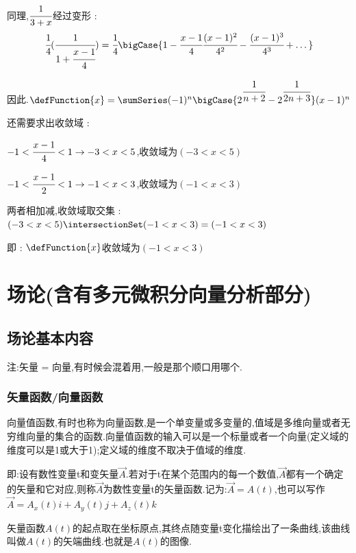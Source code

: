 {{{{\begin{enumerate}
{            同理,$\cfrac{1}{3 + x}$经过变形 :
            $$
              \cfrac{1}{4}(\cfrac{1}{1 + \cfrac{x - 1}{4}}) = \cfrac{1}{4}\bigCase{1 - \cfrac{x - 1}{4} \cfrac{(x - 1)^2}{4^2} - \cfrac{(x - 1)^3}{4^3} + \dots}
            $$

            因此.$\defFunction{x} = \sumSeries(-1)^n\bigCase{2^{\cfrac{1}{n + 2}} - 2^{\cfrac{1}{2n + 3}}}(x - 1)^n$

            还需要求出收敛域 :

            $-1 < \cfrac{x - 1}{4} < 1 \to -3 < x < 5$,收敛域为$(-3 < x < 5)$

            $-1 < \cfrac{x - 1}{2} < 1 \to -1 < x < 3$,收敛域为$(-1 < x < 3)$

            两者相加减,收敛域取交集 : $(-3 < x < 5) \intersectionSet (-1 < x < 3) = (-1 < x < 3)$

            即 : $\defFunction{x}$收敛域为$(-1 < x < 3)$
            }
    \end{enumerate}
  }%

}%

}%

\section{场论(含有多元微积分向量分析部分)}{

  \subsection{场论基本内容}{
    注:矢量 = 向量,有时候会混着用,一般是那个顺口用哪个.

    \subsubsection{矢量函数/向量函数}{
      向量值函数,有时也称为向量函数,是一个单变量或多变量的,值域是多维向量或者无穷维向量的集合的函数.向量值函数的输入可以是一个标量或者一个向量(定义域的维度可以是1或大于1);定义域的维度不取决于值域的维度.

      即:设有数性变量t和变矢量$\vec{A}$.若对于t在某个范围内的每一个数值,$\vec{A}$都有一个确定的矢量和它对应,则称$\vec{A}$为数性变量t的矢量函数.记为:$\vec{A} = A(t)$,也可以写作$\vec{A} = A_x(t)i + A_y(t)j + A_z(t)k$

      矢量函数$A(t)$的起点取在坐标原点,其终点随变量t变化描绘出了一条曲线,该曲线叫做$A(t)$的矢端曲线.也就是$A(t)$的图像.
    }%

}}}
